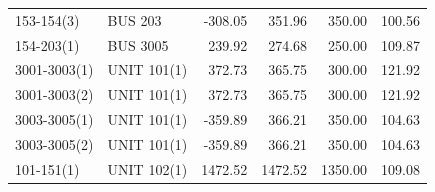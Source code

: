 \documentclass[10pt]{report}
\begin{document}
\begin{table}[H]
{\begin{tabular}{llrrrr}
153-154(3) & BUS 203 & -308.05 & 351.96 & 350.00 & 100.56 \\
154-203(1) & BUS 3005 & 239.92 & 274.68 & 250.00 & 109.87 \\
3001-3003(1) & UNIT 101(1) & 372.73 & 365.75 & 300.00 & 121.92 \\
3001-3003(2) & UNIT 101(1) & 372.73 & 365.75 & 300.00 & 121.92 \\
3003-3005(1) & UNIT 101(1) & -359.89 & 366.21 & 350.00 & 104.63 \\
3003-3005(2) & UNIT 101(1) & -359.89 & 366.21 & 350.00 & 104.63 \\
101-151(1) & UNIT 102(1) & 1472.52 & 1472.52 & 1350.00 & 109.08 \\
\bottomrule
\end{tabular}}
\end{table}
\end{document}
